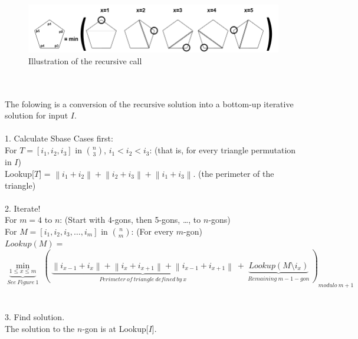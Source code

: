 \documentclass[10pt]{article}
\newcommand{\tab}{\hspace*{2em}}
\newcommand{\tabb}{\hspace*{4em}}
\newcommand{\tabbb}{\hspace*{6em}}
\begin{document}
				\begin{figure}[h]
					\centering
						\includegraphics[width=450px]{dynamic7r.png}
					\caption{Illustration of the recursive call}
				\end{figure}\\
				\\
				The folowing is a conversion of the recursive solution into a bottom-up iterative solution for input $I$.\\
				\\
				1. Calculate Sbase Cases first:\\
				\tab For $T = [i_1, i_2, i_3]$ in $n \choose 3$, $i_1 < i_2 < i_3$: (that is, for every triangle permutation in $I$)\\
				\tabb Lookup[$T$] = $\left\|i_1+i_2\right\|+\left\|i_2+i_3\right\|+\left\|i_1+i_3\right\|$. (the perimeter of the triangle)\\
				\\
				2. Iterate!\\
				\tab For $m = 4$ to $n$: (Start with 4-gons, then 5-gons, \ldots, to $n$-gons)\\
				\tabb For $M = [i_1, i_2, i_3, \ldots, i_m]$ in $n \choose m$: (For every $m$-gon)\\
				\tabbb $Lookup(M) =$
				\[{\underbrace{\min_{1 \leq x \leq m}}_{See~Figure~1}~(~
					\underbrace{\left\|i_{x-1}+i_x\right\|+\left\|i_x+i_{x+1}\right\|+\left\|i_{x-1}+i_{x+1}\right\|}_{Perimeter~of~triangle~defined~by~x}
					~+~
					\underbrace{Lookup(M \setminus i_{x})}_{Remaining~m-1-gon}~)
					}_{modulo~m+1}\]\\
				\\
				3. Find solution.\\
				\tab The solution to the $n$-gon is at Lookup[$I$].
				
\end{document}
